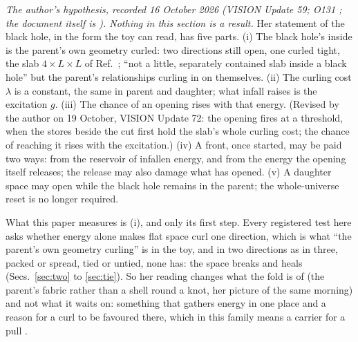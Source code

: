 \documentclass[aps,pre,10pt,twocolumn,superscriptaddress,nofootinbib]{revtex4-2}
\begin{document}
\emph{The author's hypothesis, recorded 16 October 2026 (VISION Update 59; O131 \cite{repo}; the document itself
is \cite{handoff}). Nothing in this section is a result.} Her statement of the black hole, in the form the toy can
read, has five parts. (i) The black hole's inside is the parent's own geometry curled: two directions still open,
one curled tight, the slab $4 \times L \times L$ of Ref.~\cite{paper5}; ``not a little, separately contained slab
inside a black hole'' but the parent's relationships curling in on themselves. (ii) The curling cost $\lambda$ is a
constant, the same in parent and daughter; what infall raises is the excitation $g$. (iii) The chance of an opening
rises with that energy. (Revised by the author on 19 October, VISION Update 72: the opening fires at a
threshold, when the stores beside the cut first hold the slab's whole curling cost; the chance of reaching it
rises with the excitation.) (iv) A front, once started, may be paid two ways: from the
reservoir of infallen energy, and from the energy the opening itself releases; the release may also damage what has
opened. (v) A daughter space may open while the black hole remains in the parent; the whole-universe reset is no
longer required.

What this paper measures is (i), and only its first step. Every registered test here asks whether energy alone makes
flat space curl one direction, which is what ``the parent's own geometry curling'' is in the toy, and in two
directions as in three, packed or spread, tied or untied, none has: the space breaks and heals (Secs.~\ref{sec:two}
to \ref{sec:tie}). So her reading changes what the fold is of (the parent's fabric rather than a shell round a knot,
her picture of the same morning) and not what it waits on: something that gathers energy in one place and a reason
for a curl to be favoured there, which in this family means a carrier for a pull \cite{paper11}.
\end{document}

